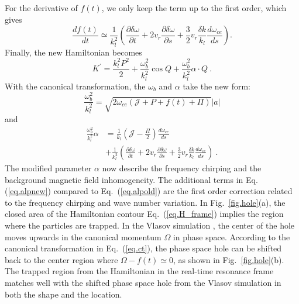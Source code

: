 For the derivative of $f(t)$, we only keep the term up to the first order, which gives
\begin{equation}
    \frac{d f(t)}{d t} \simeq \frac{1}{k_l^2}(\frac{\partial \delta \omega}{\partial t} + 2 v_r \frac{\partial \delta \omega}{\partial s} + \frac{3}{2}v_r\frac{\delta k}{k_l} \frac{d \omega_{ce}}{d s}  ).
\end{equation}
Finally, the new Hamiltonian becomes 
\begin{equation}\label{eq.H_frame}
    K^\prime = \frac{k_l^2 P^2}{2} + \frac{{\omega^2_{b}}}{k_l^2} \cos Q +\frac{{\omega^2_{b}}}{k_l^2} \alpha \cdot Q~.
\end{equation}
With the canonical  transformation,
the $\omega_{b}$
and  $\alpha$ take the new form: 
\begin{equation}\label{eq.wbnew}
    \frac{{\omega^2_{b}}}{k_l^2} = \sqrt{2\omega_{ce}(\mathcal{J}+P+f(t)+\Pi)}  |a|
\end{equation}
and 
\begin{equation}\label{eq.alpnew}
    \begin{aligned}
    \frac{{\omega^2_{b}}}{k_l^2}\alpha & = \frac{1}{k_l}\left(\mathcal{J} - \frac{\Pi}{2}\right) \frac{d\omega_{ce}}{ds} \\
    & + \frac{1}{k_l^2}\left(\frac{\partial \delta \omega}{\partial t} + 2 v_r \frac{\partial \delta \omega}{\partial s} + \frac{3}{2}v_r\frac{\delta k}{k_l} \frac{d \omega_{ce}}{d s}\right)~.
    \end{aligned}
\end{equation}
The modified parameter $\alpha$ now describe the frequency chirping and the background magnetic field inhomogeneity.
The additional terms in Eq. (\ref{eq.alpnew}) compared to Eq.~(\ref{eq.alpold}) are the first order correction related to the frequency chirping and wave number variation.
In Fig.~\ref{fig.hole}(a),
the closed area of the Hamiltonian contour Eq.~(\ref{eq.H_frame})
implies the region where the particles are trapped. 
In the Vlasov simulation
\cite{zheng2024},
the center of the hole moves upwards in the canonical momentum  
$\Omega$
in phase space.  
According to the canonical transformation in Eq.~(\ref{eq.ct}), 
the  phase space hole 
can be shifted back to the center region where $\Omega-f(t)\simeq 0$,
as shown in Fig.~\ref{fig.hole}(b). 
The trapped region from the Hamiltonian 
     in the real-time resonance frame 
 matches well with the shifted phase space hole from the Vlasov simulation in both the shape and the location.

